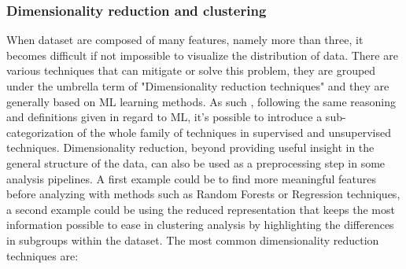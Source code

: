 \subsubsection{Dimensionality reduction and clustering}
When dataset are composed of many features, namely more than three, it becomes difficult if not impossible to visualize the distribution of data. There are various techniques that can mitigate or solve this problem, they are grouped under the umbrella term of "Dimensionality reduction techniques" and they are generally based on ML learning methods. As such , following the same reasoning and definitions given in regard to ML, it's possible to introduce a sub-categorization of the whole family of techniques in supervised and unsupervised techniques. Dimensionality reduction, beyond providing useful insight in the general structure of the data, can also be used as a preprocessing step in some analysis pipelines. A first example could be to find more meaningful features before analyzing with methods such as Random Forests or Regression techniques, a second example could be using the reduced representation that keeps the most information possible to ease in clustering analysis by highlighting the differences in subgroups within the dataset. The most common dimensionality reduction techniques are:

